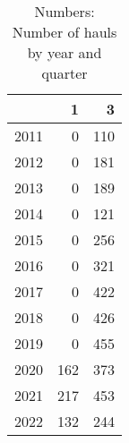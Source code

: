\begin{table}[ht]
\centering
\begin{tabular}{rrr}
  \hline
 & 1 & 3 \\ 
  \hline
2011 & 0 & 110 \\ 
  2012 & 0 & 181 \\ 
  2013 & 0 & 189 \\ 
  2014 & 0 & 121 \\ 
  2015 & 0 & 256 \\ 
  2016 & 0 & 321 \\ 
  2017 & 0 & 422 \\ 
  2018 & 0 & 426 \\ 
  2019 & 0 & 455 \\ 
  2020 & 162 & 373 \\ 
  2021 & 217 & 453 \\ 
  2022 & 132 & 244 \\ 
   \hline
\end{tabular}
\caption{Numbers: Number of hauls by year and quarter} 
\end{table}
